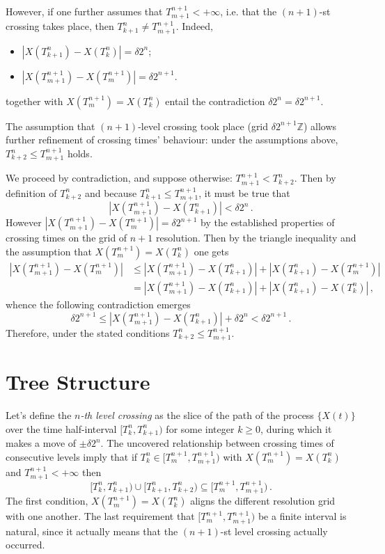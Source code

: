 However, if one further assumes that $T_{m+1}^{n+1} < +\infty$, i.e. that the $(n+1)$-st
crossing takes place, then $T_{k+1}^n \neq T_{m+1}^{n+1}$. Indeed, \begin{itemize}
	\item $|X(T_{k+1}^n)-X(T_k^n)| = \delta 2^n$;
	\item $|X(T_{m+1}^{n+1})-X(T_m^{n+1})| = \delta 2^{n+1}$.
\end{itemize}
together with $X(T_m^{n+1}) = X(T_k^n)$ entail the contradiction $\delta 2^n = \delta 2^{n+1}$.

The assumption that $(n+1)$-level crossing took place (grid $\delta 2^{n+1} \mathbb{Z}$)
allows further refinement of crossing times' behaviour: under the assumptions above,
$T_{k+2}^n\leq T_{m+1}^{n+1}$ holds.

We proceed by contradiction, and suppose otherwise: $T_{m+1}^{n+1} < T_{k+2}^n$.
Then by definition of $T_{k+2}^n$ and because $T_{k+1}^n \leq T_{m+1}^{n+1}$, it
must be true that
\[ |X(T_{m+1}^{n+1}) - X(T_{k+1}^n)| < \delta 2^n \,.\]
However $|X(T_{m+1}^{n+1}) - X(T_m^{n+1})| = \delta 2^{n+1}$ by the established
properties of crossing times on the grid of $n+1$ resolution. Then by the triangle
inequality and the assumption that $X(T_m^{n+1}) = X(T_k^n)$ one gets
\begin{align*}
    |X(T_{m+1}^{n+1}) - X(T_m^{n+1})| 
    & \leq |X(T_{m+1}^{n+1}) - X(T_{k+1}^n)| + |X(T_{k+1}^n) - X(T_m^{n+1})| \\
    & = |X(T_{m+1}^{n+1}) - X(T_{k+1}^n)| + |X(T_{k+1}^n) - X(T_k^n)|\,,
\end{align*}
whence the following contradiction emerges
\[
\delta 2^{n+1}
\leq |X(T_{m+1}^{n+1}) - X(T_{k+1}^n)| + \delta 2^n
< \delta 2^{n+1}\,.
\]
Therefore, under the stated conditions $T_{k+2}^n\leq T_{m+1}^{n+1}$.



\section{Tree Structure} %
\label{sec:tree_structure}

Let's define the \emph{$n$-th level crossing} as the slice of the path of the process
$\{X(t)\}$ over the time half-interval $[T_k^n,T_{k+1}^n)$ for some integer $k\geq 0$,
during which it makes a move of $\pm \delta 2^n$. The uncovered relationship between
crossing times of consecutive levels imply that if $T_k^n \in [T_m^{n+1}, T_{m+1}^{n+1})$
with $X(T_m^{n+1}) = X(T_k^n)$ and $T_{m+1}^{n+1} < +\infty$ then
\[
\bigl[T_k^n,T_{k+1}^n\bigr) \cup \bigl[T_{k+1}^n,T_{k+2}^n\bigr)
\subseteq \bigl[T_m^{n+1},T_{m+1}^{n+1}\bigr) \,.
\]
The first condition, $X(T_m^{n+1}) = X(T_k^n)$ aligns the different resolution grid
with one another. The last requirement that $[T_m^{n+1}, T_{m+1}^{n+1})$ be a finite
interval is natural, since it actually means that the $(n+1)$-st level crossing actually
occurred.

